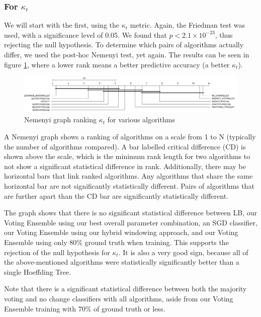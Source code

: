 \subsubsection{For $\kappa_t$}

We will start with the first, using the $\kappa_t$ metric. Again, the Friedman test was used, with a significance level of 0.05. We found that $p < 2.1\times10^{-23}$, thus rejecting the null hypothesis.
To determine which pairs of algorithms actually differ, we used the post-hoc Nemenyi test, yet again. The results can be seen in figure \ref{fig:sota_compare_all_kappa_nemenyi}, where a lower rank means a better predictive accuracy (a better $\kappa_t$).

\begin{figure}
  \includegraphics[width=\linewidth]{./images/chapter5/sota_compare_all_kappa_nemenyi}
\caption{\label{fig:sota_compare_all_kappa_nemenyi}Nemenyi graph ranking $\kappa_t$ for various algorithms}
\end{figure}

A Nemenyi graph shows a ranking of algorithms on a scale from 1 to N (typically the number of algorithms compared). A bar labelled critical difference (CD) is shown above the scale, which is the minimum rank length for two algorithms to not show a significant statistical difference in rank. 
Additionally, there may be horizontal bars that link ranked algorithms. Any algorithms that share the same horizontal bar are not significantly statistically different. Pairs of algorithms that are further apart than the CD bar are significantly statistically different.

The graph shows that there is no significant statistical difference between LB, our Voting Ensemble using our best overall parameter combination, an SGD classifier, our Voting Ensemble using our hybrid windowing approach, and our Voting Ensemble using only $80\%$ ground truth when training. This supports the rejection of the null hypothesis for $\kappa_t$. It is also a very good sign, because all of the above-mentioned algorithms were statistically significantly better than a single Hoeffding Tree.

Note that there is a significant statistical difference between both the majority voting and no change classifiers with all algorithms, aside from our Voting Ensemble training with $70\%$ of ground truth or less.


